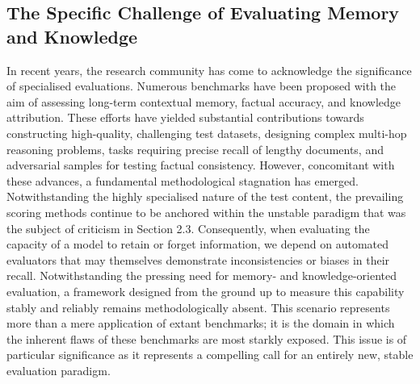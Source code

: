 \subsection{The Specific Challenge of Evaluating Memory and Knowledge}
In recent years, the research community has come to acknowledge the significance of specialised evaluations. Numerous benchmarks have been proposed with the aim of assessing long-term contextual memory, factual accuracy, and knowledge attribution\cite{liu2023think}\cite{li2024enhancingllmfactualaccuracy}\cite{wang2024should}. These efforts have yielded substantial contributions towards constructing high-quality, challenging test datasets, designing complex multi-hop reasoning problems, tasks requiring precise recall of lengthy documents, and adversarial samples for testing factual consistency\cite{gekhman2023trueteacher}\cite{tam2023evaluating}.
However, concomitant with these advances, a fundamental methodological stagnation has emerged. Notwithstanding the highly specialised nature of the test content, the prevailing scoring methods continue to be anchored within the unstable paradigm that was the subject of criticism in Section 2.3.
Consequently, when evaluating the capacity of a model to retain or forget information, we depend on automated evaluators that may themselves demonstrate inconsistencies or biases in their recall\cite{abeysinghe2024challenges}\cite{chen2025multi}. Notwithstanding the pressing need for memory- and knowledge-oriented evaluation, a framework designed from the ground up to measure this capability stably and reliably remains methodologically absent. This scenario represents more than a mere application of extant benchmarks; it is the domain in which the inherent flaws of these benchmarks are most starkly exposed. This issue is of particular significance as it represents a compelling call for an entirely new, stable evaluation paradigm.

